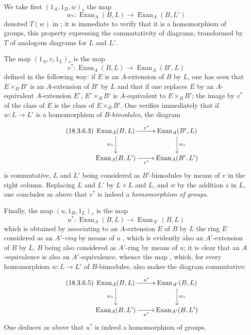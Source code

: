 \begin{env}[18.3.6]
\label{0.18.3.6}
We take first $(1_A,1_B,w)_*$ the map
\begin{equation}
\tag{18.3.6.1}
  \label{0.18.3.6.1}
  w_*:\operatorname{Exan}_A(B,L)\to\operatorname{Exan}_A(B,L')
\end{equation}
denoted $T(w)$ in ; it is immediate to verify that it is a homomorphism of groups, this property expressing the commutativity of diagrams, transformed by $T$ of analogous diagrams for $L$ and $L'$.

The map $(1_A,v,1_L)_*$ is the map
\begin{equation}
\tag{18.3.6.2}
  \label{0.18.3.6.2}
  v^*:\operatorname{Exan}_A(B,L)\to\operatorname{Exan}_A(B',L)
\end{equation}
defined in the following way: if $E$ is an $A$-extension of $B$ by $L$, one has seen that $E\times_B B'$ is an $A$-extension of $B'$ by $L$  and that if one replaces $E$ by an $A$-equivalent $A$-extension $E'$, $E'\times_B B'$ is $A$-equivalent to $E\times_B B'$; the image by $v^*$ of the class of $E$ is the class of $E\times_B B'$.
One verifies immediately that if $w:L\to L'$ is a homomorphism of $B$-\emph{bimodules}, the diagram
\begin{equation}
\tag{18.3.6.3}
  \label{0.18.3.6.3}
  \xymatrix{
    \operatorname{Exan}_A(B,L)\ar[r]^{v^*}\ar[d]_{w_*} & \operatorname{Exan}_A(B',L)\ar[d]^{w_*}\\
    \operatorname{Exan}_A(B,L')\ar[r]_{v^*} & \operatorname{Exan}_A(B',L')
  }
\end{equation}
is commutative, $L$ and $L'$ being considered as $B'$-bimodules by means of $v$ in the right column.
Replacing $L$ and $L'$ by $L\times L$ and $L$, and $w$ by the addition $s$ in $L$, one concludes as above that $v^*$ is indeed a \emph{homomorphism of groups}.


Finally, the map $(u,1_B,1_L)_*$ is the map
\begin{equation}
\tag{18.3.6.4}
  \label{0.18.3.6.4}
  u^*:\operatorname{Exan}_A(B,L)\to\operatorname{Exan}_{A'}(B,L)
\end{equation}
which is obtained by associating to an $A$-extension $E$ of $B$ by $L$ the ring $E$ considered as an $A'$-\emph{ring} by means of $u$ , which is evidently also an $A'$-extension of $B$ by $L$, $B$ being also considered as $A'$-ring by means of $u$; it is clear that an $A$-equivalence is also an $A'$-equivalence, whence the map , which, for every homomorphism $w:L\to L'$ of $B$-bimodules, also makes the diagram commutative:
  \begin{equation}
  \tag{18.3.6.5}
  \label{0.18.3.6.5}
  \xymatrix{
    \operatorname{Exan}_A(B,L)\ar[r]^{u^*}\ar[d]_{w_*} & \operatorname{Exan}_{A'}(B,L)\ar[d]^{w_*}\\
    \operatorname{Exan}_A(B,L')\ar[r]_{u^*} & \operatorname{Exan}_{A'}(B,L')
  }
  \end{equation}
One deduces as above that $u^*$ is indeed a homomorphism of groups.


\end{env}
